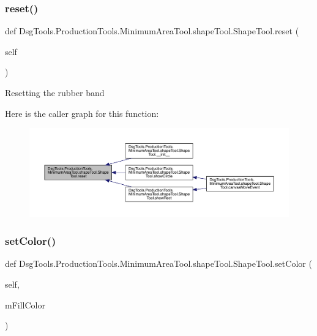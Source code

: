 \subsubsection{\texorpdfstring{reset()}{reset()}}
{\footnotesize\ttfamily def Dsg\+Tools.\+Production\+Tools.\+Minimum\+Area\+Tool.\+shape\+Tool.\+Shape\+Tool.\+reset (\begin{DoxyParamCaption}\item[{}]{self }\end{DoxyParamCaption})}

\begin{DoxyVerb}Resetting the rubber band
\end{DoxyVerb}
 Here is the caller graph for this function\+:
\nopagebreak
\begin{figure}[H]
\begin{center}
\leavevmode
\includegraphics[width=350pt]{class_dsg_tools_1_1_production_tools_1_1_minimum_area_tool_1_1shape_tool_1_1_shape_tool_a353d9b814ba5aaca64cefe209b1725b8_icgraph}
\end{center}
\end{figure}
\mbox{\label{class_dsg_tools_1_1_production_tools_1_1_minimum_area_tool_1_1shape_tool_1_1_shape_tool_ad5d51bbe618c8824ed4ef49cb2881865}} 
\subsubsection{\texorpdfstring{set\+Color()}{setColor()}}
{\footnotesize\ttfamily def Dsg\+Tools.\+Production\+Tools.\+Minimum\+Area\+Tool.\+shape\+Tool.\+Shape\+Tool.\+set\+Color (\begin{DoxyParamCaption}\item[{}]{self,  }\item[{}]{m\+Fill\+Color }\end{DoxyParamCaption})}

